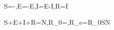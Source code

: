 \dot S=-\beta{},\quad\dot E=\beta{}-\sigma E,\quad\dot I=\sigma E-\gamma I,\quad\dot R=\gamma I

S+E+I+R=N,\qquad R_0=\frac\beta\gamma,\quad R_e=R_0\frac SN
